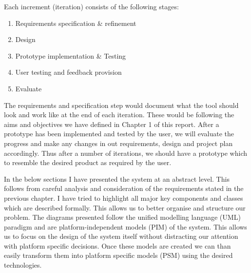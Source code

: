 Each increment (iteration) consists of the following stages:
\begin{enumerate}
	\item Requirements specification \& refinement
	\item Design
	\item Prototype implementation \& Testing
	\item User testing and feedback provision
	\item Evaluate
\end{enumerate}
The requirements and specification step would document what the tool should look and work like at the end of each iteration. These would be following the aims and objectives we have defined in Chapter 1 of this report. After a prototype has been implemented and tested by the user, we will evaluate the progress and make any changes in out requirements, design and project plan accordingly. Thus after a number of iterations, we should have a prototype which to resemble the desired product as required by the user.

In the below sections I have presented the system at an abstract level. This follows from careful analysis and consideration of the requirements stated in the previous chapter. I have tried to highlight all major key components and classes which are described formally. This allows us to better organise and structure our problem. The diagrams presented follow the unified modelling language (UML) paradigm \cite{uml} and are platform-independent models (PIM) of the system. This allows us to focus on the design of the system itself without distracting our attention with platform specific decisions. Once these models are created we can than easily transform them into platform specific models (PSM) using the desired technologies.

